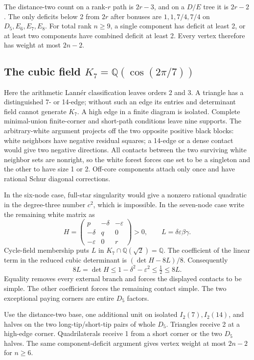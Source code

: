 \documentclass[11pt]{article}
\newcommand{\Q}{\mathbb Q}
\begin{document}
The distance-two count on a rank-$r$ path is $2r-3$, and on a $D/E$ tree
it is $2r-2$. The only deficits below 2 from $2r$ after bonuses are
$1,1,7/4,7/4$ on $D_5,E_6,E_7,E_8$. For total rank $n\ge 9$, a
single component has deficit at least 2, or at least two components have
combined deficit at least 2. Every vertex therefore has weight at most
$2n-2$.

\subsection{The cubic field \texorpdfstring{$K_7=\Q(\cos(2\pi/7))$}{K7}}
Here the arithmetic Lann\'er classification leaves orders 2 and 3. A
triangle has a distinguished 7- or 14-edge; without such an edge its
entries and determinant field cannot generate $K_7$. A high edge in a
finite diagram is isolated. Complete minimal-union finite-corner and
short-path conditions leave nine supports. The arbitrary-white argument
projects off the two opposite positive black blocks: white neighbors
have negative residual squares; a 14-edge or a dense contact would give
two negative directions. All contacts between the two surviving white
neighbor sets are nonright, so the white forest forces one set to be a
singleton and the other to have size 1 or 2. Off-core components attach
only once and have rational Schur diagonal corrections.

In the six-node case, full-star singularity would give a nonzero rational
quadratic in the degree-three number $c^2$, which is impossible. In the
seven-node case write the remaining white matrix as
\[
 H=\begin{pmatrix}p&-\delta&-\varepsilon\\
 -\delta&q&0\\-\varepsilon&0&r\end{pmatrix}>0,
 \qquad L=\delta\varepsilon\beta\gamma.
\]
Cycle-field membership puts $L$ in $K_7\cap\Q(\sqrt 2)=\Q$.
The coefficient of the linear term in the reduced cubic determinant is
$(\det H-8L)/8$. Consequently
\[
 8L=\det H\le 1-\delta^2-\varepsilon^2\le\tfrac 12\le 8L.
\]
Equality removes every external branch and forces the displayed contacts
to be simple. The other coefficient forces the remaining contact simple.
The two exceptional paying corners are entire $D_5$ factors.

Use the distance-two base, one additional unit on isolated
$I_2(7),I_2(14)$, and halves on the two long-tip/short-tip pairs of whole
$D_5$. Triangles receive 2 at a high-edge corner. Quadrilaterals receive 1
from a short corner or the two $D_5$ halves. The same component-deficit
argument gives vertex weight at most $2n-2$ for $n\ge 6$.
\end{document}
